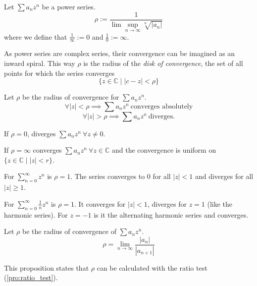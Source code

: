 \begin{definition}
   Let \(\sum a_n z^n\) be a power series.
   \[\rho := \frac{1}{\lim\sup_{n \to \infty} \sqrt[n]{|a_n|}}\]
   where we define that \(\frac{1}{\infty} := 0\) and \(\frac{1}{0} := \infty\).
\end{definition}
\begin{remark}[Intuition]
   As power series are complex series, their convergence can be imagined as an inward spiral.
   This way \(\rho\) is the radius of the \emph{disk of convergence}, the set of all points for which the series converges
   \[\{z \in \mathbb{C} \mid |c - z| < \rho\}\]
\end{remark}

%    

\begin{theorem}\label{thm:conv_radius}
   Let \(\rho\) be the radius of convergence for \(\sum a_n z^n\).
   \[\forall |z| < \rho \implies \sum a_n z^n~\text{converges absolutely}\]
   \[\forall |z| > \rho \implies \sum a_n z^n~\text{diverges.}\]
\end{theorem}
\begin{remark}
   If \(\rho = 0\), diverges \(\sum a_nz^n~\forall z \neq 0\).

   If \(\rho = \infty\) converges \(\sum a_nz^n~\forall z \in \mathbb{C}\) and the convergence is uniform on \(\{z \in \mathbb{C} \mid |z| < r\}\).
\end{remark}
\begin{example}
   For \(\sum_{n=0}^\infty z^n\) is \(\rho = 1\).
   The series converges to 0 for all \(|z| < 1\) and diverges for all \(|z| \geq 1\).
\end{example}
\begin{example}
   For \(\sum_{n=0}^\infty \frac{1}{n} z^n\) is \(\rho = 1\).
   It converges for \(|z| < 1\), diverges for \(z = 1\) (like the harmonic series).
   For \(z = -1\) is it the alternating harmonic series and converges.
\end{example}

\begin{proposition}\label{pro:conv_rad_ratio_test}
   Let \(\rho\) be the radius of convergence of \(\sum a_n z^n\).
   \[\rho = \lim_{n \to \infty} \frac{|a_n|}{|a_{n+1}|}\]
\end{proposition}
\begin{remark}
   This proposition states that \(\rho\) can be calculated with the ratio test (\ref{pro:ratio_test}).
\end{remark}

